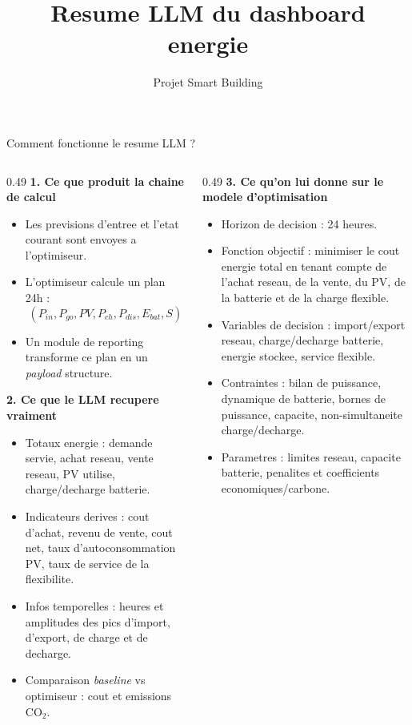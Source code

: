 \documentclass{beamer}
\title{Resume LLM du dashboard energie}
\author{Projet Smart Building}
\date{}
\begin{document}
\begin{frame}{Comment fonctionne le resume LLM ?}
\small
\begin{columns}[T]
\begin{column}{0.49\textwidth}
\textbf{1. Ce que produit la chaine de calcul}
\begin{itemize}
\item Les previsions d'entree et l'etat courant sont envoyes a l'optimiseur.
\item L'optimiseur calcule un plan 24h :
\[
(P_{in}, P_{go}, PV, P_{ch}, P_{dis}, E_{bat}, S)
\]
\item Un module de reporting transforme ce plan en un \textit{payload} structure.
\end{itemize}

\vspace{0.4em}
\textbf{2. Ce que le LLM recupere vraiment}
\begin{itemize}
\item Totaux energie : demande servie, achat reseau, vente reseau, PV utilise, charge/decharge batterie.
\item Indicateurs derives : cout d'achat, revenu de vente, cout net, taux d'autoconsommation PV, taux de service de la flexibilite.
\item Infos temporelles : heures et amplitudes des pics d'import, d'export, de charge et de decharge.
\item Comparaison \textit{baseline} vs optimiseur : cout et emissions CO$_2$.
\end{itemize}
\end{column}

\begin{column}{0.49\textwidth}
\textbf{3. Ce qu'on lui donne sur le modele d'optimisation}
\begin{itemize}
\item Horizon de decision : 24 heures.
\item Fonction objectif : minimiser le cout energie total en tenant compte de l'achat reseau, de la vente, du PV, de la batterie et de la charge flexible.
\item Variables de decision : import/export reseau, charge/decharge batterie, energie stockee, service flexible.
\item Contraintes : bilan de puissance, dynamique de batterie, bornes de puissance, capacite, non-simultaneite charge/decharge.
\item Parametres : limites reseau, capacite batterie, penalites et coefficients economiques/carbone.
\end{itemize}


\end{column}
\end{columns}
\end{frame}
\end{document}
